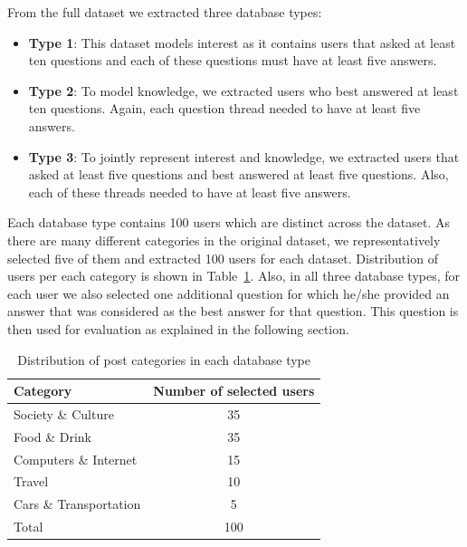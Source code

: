 \documentclass[conference]{IEEEtran}
\newcommand{\tblref}[1]{Table~\ref{#1}}
\begin{document}
From the full dataset we extracted three database types:
\begin{itemize}
	\item {\bf Type 1}: This dataset models interest as it contains users that asked at least ten questions and each of these questions must have at least five answers.
	\item {\bf Type 2}: To model knowledge, we extracted users who best answered at least ten questions. Again, each question thread needed to have at least five answers.
	\item {\bf Type 3}: To jointly represent interest and knowledge, we extracted users that asked at least five questions and best answered at least five questions. Also, each of these threads needed to have at least five answers.
\end{itemize}
Each database type contains 100 users which are distinct across the dataset. As there are many different categories in the original dataset, we representatively selected five of them and extracted 100 users for each dataset. Distribution of users per each category is shown in \tblref{tab:datasets}.
Also, in all three database types, for each user we also selected one additional question for which he/she provided an answer that was considered as the best answer for that question. This question is then used for evaluation as explained in the following section. 
\begin{table}[!h]
	\setlength{\belowcaptionskip}{-5pt}
	\centering
	\renewcommand{\arraystretch}{1.3}
	\caption{Distribution of post categories in each database type}
	\addtolength{\parskip}{-0.2cm}
	\label{tab:datasets}
	\begin{tabular}{l|c}\hline
		Category & Number of selected users\\\hline\hline
		Society \& Culture & 35\\
		Food \& Drink & 35\\
		Computers \& Internet & 15\\
		Travel & 10\\
		Cars \& Transportation & 5\\\hline\hline
		Total & 100\\\hline
	\end{tabular}
	
\end{table}
\vspace{-0.5cm}
\end{document}

